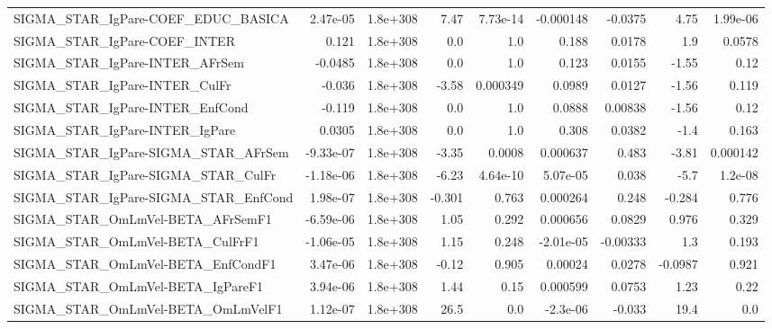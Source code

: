 \begin{tabular}{lrrrrrrrr}
SIGMA\_STAR\_IgPare-COEF\_EDUC\_BASICA    &    2.47e-05 &     1.8e+308 &    7.47 & 7.73e-14 &  -0.000148 &     -0.0375 &         4.75 &      1.99e-06 \\
SIGMA\_STAR\_IgPare-COEF\_INTER          &       0.121 &     1.8e+308 &     0.0 &      1.0 &      0.188 &      0.0178 &          1.9 &        0.0578 \\
SIGMA\_STAR\_IgPare-INTER\_AFrSem        &     -0.0485 &     1.8e+308 &     0.0 &      1.0 &      0.123 &      0.0155 &        -1.55 &          0.12 \\
SIGMA\_STAR\_IgPare-INTER\_CulFr         &      -0.036 &     1.8e+308 &   -3.58 & 0.000349 &     0.0989 &      0.0127 &        -1.56 &         0.119 \\
SIGMA\_STAR\_IgPare-INTER\_EnfCond       &      -0.119 &     1.8e+308 &     0.0 &      1.0 &     0.0888 &     0.00838 &        -1.56 &          0.12 \\
SIGMA\_STAR\_IgPare-INTER\_IgPare        &      0.0305 &     1.8e+308 &     0.0 &      1.0 &      0.308 &      0.0382 &         -1.4 &         0.163 \\
SIGMA\_STAR\_IgPare-SIGMA\_STAR\_AFrSem   &   -9.33e-07 &     1.8e+308 &   -3.35 &   0.0008 &   0.000637 &       0.483 &        -3.81 &      0.000142 \\
SIGMA\_STAR\_IgPare-SIGMA\_STAR\_CulFr    &   -1.18e-06 &     1.8e+308 &   -6.23 & 4.64e-10 &   5.07e-05 &       0.038 &         -5.7 &       1.2e-08 \\
SIGMA\_STAR\_IgPare-SIGMA\_STAR\_EnfCond  &    1.98e-07 &     1.8e+308 &  -0.301 &    0.763 &   0.000264 &       0.248 &       -0.284 &         0.776 \\
SIGMA\_STAR\_OmLmVel-BETA\_AFrSemF1      &   -6.59e-06 &     1.8e+308 &    1.05 &    0.292 &   0.000656 &      0.0829 &        0.976 &         0.329 \\
SIGMA\_STAR\_OmLmVel-BETA\_CulFrF1       &   -1.06e-05 &     1.8e+308 &    1.15 &    0.248 &  -2.01e-05 &    -0.00333 &          1.3 &         0.193 \\
SIGMA\_STAR\_OmLmVel-BETA\_EnfCondF1     &    3.47e-06 &     1.8e+308 &   -0.12 &    0.905 &    0.00024 &      0.0278 &      -0.0987 &         0.921 \\
SIGMA\_STAR\_OmLmVel-BETA\_IgPareF1      &    3.94e-06 &     1.8e+308 &    1.44 &     0.15 &   0.000599 &      0.0753 &         1.23 &          0.22 \\
SIGMA\_STAR\_OmLmVel-BETA\_OmLmVelF1     &    1.12e-07 &     1.8e+308 &    26.5 &      0.0 &   -2.3e-06 &      -0.033 &         19.4 &           0.0 \\

\end{tabular}
